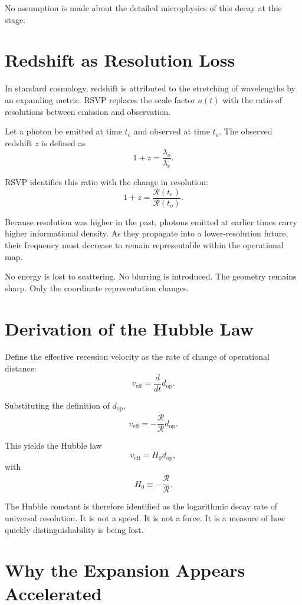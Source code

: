 \documentclass[11pt]{book}
\begin{document}
No assumption is made about the detailed microphysics of this decay at this stage.

\section{Redshift as Resolution Loss}

In standard cosmology, redshift is attributed to the stretching of wavelengths by an expanding metric. RSVP replaces the scale factor \(a(t)\) with the ratio of resolutions between emission and observation.

Let a photon be emitted at time \(t_e\) and observed at time \(t_o\). The observed redshift \(z\) is defined as
\[
1 + z = \frac{\lambda_o}{\lambda_e} .
\]

RSVP identifies this ratio with the change in resolution:
\[
1 + z = \frac{\mathcal{R}(t_e)}{\mathcal{R}(t_o)} .
\]

Because resolution was higher in the past, photons emitted at earlier times carry higher informational density. As they propagate into a lower-resolution future, their frequency must decrease to remain representable within the operational map.

No energy is lost to scattering. No blurring is introduced. The geometry remains sharp. Only the coordinate representation changes.

\section{Derivation of the Hubble Law}

Define the effective recession velocity as the rate of change of operational distance:
\[
v_{\text{eff}} = \frac{d}{dt} d_{\text{op}} .
\]

Substituting the definition of \(d_{\text{op}}\),
\[
v_{\text{eff}} = - \frac{\dot{\mathcal{R}}}{\mathcal{R}} d_{\text{op}} .
\]

This yields the Hubble law
\[
v_{\text{eff}} = H_0 d_{\text{op}} ,
\]
with
\[
H_0 \equiv - \frac{\dot{\mathcal{R}}}{\mathcal{R}} .
\]

The Hubble constant is therefore identified as the logarithmic decay rate of universal resolution. It is not a speed. It is not a force. It is a measure of how quickly distinguishability is being lost.

\section{Why the Expansion Appears Accelerated}
\end{document}
